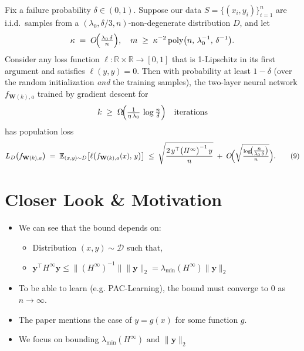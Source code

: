 \documentclass[serif, aspectratio=169]{beamer}
\begin{document}
\begin{frame}
	
	\label{thm:5.1}
	Fix a failure probability $\delta \in (0,1)$. 
	Suppose our data $S = \{(x_i,y_i)\}_{i=1}^n$ are i.i.d.\ samples 
	from a $(\lambda_0,\delta/3,n)$-non-degenerate distribution $D$, 
	and let 
	\[
	\kappa \;=\; O\!\Bigl(\tfrac{\lambda_0\,\delta}{n}\Bigr),
	\quad
	m \;\ge\; \kappa^{-2}\,\mathrm{poly}\bigl(n,\,\lambda_0^{-1},\,\delta^{-1}\bigr).
	\]
	Consider any loss function 
	$\ell:\mathbb{R}\times\mathbb{R}\to[0,1]$ 
	that is 1-Lipschitz in its first argument and satisfies $\ell(y,y)=0$. 
	Then with probability at least $1 - \delta$ 
	(over the random initialization \emph{and} the training samples), 
	the two-layer neural network $f_{\mathbf{W}(k),a}$ 
	trained by gradient descent for 
	\[
	k \;\ge\; \Omega\!\Bigl(\tfrac{1}{\eta\,\lambda_0}\,\log\tfrac{n}{\delta}\Bigr)
	\quad\text{iterations}
	\]
	has population loss
	\[
	L_D\bigl(f_{\mathbf{W}(k),a}\bigr)
	\;=\;
	\mathbb{E}_{(x,y)\sim D}\bigl[\ell\bigl(f_{\mathbf{W}(k),a}(x),\,y\bigr)\bigr]
	\;\le\;
	\sqrt{\frac{2\,y^\top \bigl(H^\infty\bigr)^{-1}\,y}{n}}
	\;+\;
	O\!\Bigl(\sqrt{\tfrac{\log\!\bigl(\tfrac{n}{\lambda_0\,\delta}\bigr)}{n}}\Bigr).
	\tag{9}
	\]
	
\end{frame}

\section{Closer Look \& Motivation}

\begin{frame}
	\begin{itemize}
		\item We can see that the bound depends on:
		\begin{itemize}
			
			\item Distribution \((x,y) \sim \mathcal{D}\) such that,
			\item \(\mathbf{y}^\top H^\infty \mathbf{y} \leq \|(H^\infty)^{-1}\| \|\mathbf{y}\|_2 = \lambda_{\min}(H^{\infty}) \|\mathbf{y}\|_2 \)
		\end{itemize}  
		
		
		\item To be able to  learn (e.g. PAC-Learning), the bound must converge to \(0\) as \(n \to \infty\).
		
		\item The paper mentions the case of \(y=g(x)\) for some function \(g\).
		
		\item We focus on bounding \(\lambda_{\min}(H^{\infty}) \text{ and } \|\mathbf{y}\|_2\)
		
	\end{itemize}
	
\end{frame}
\end{document}
